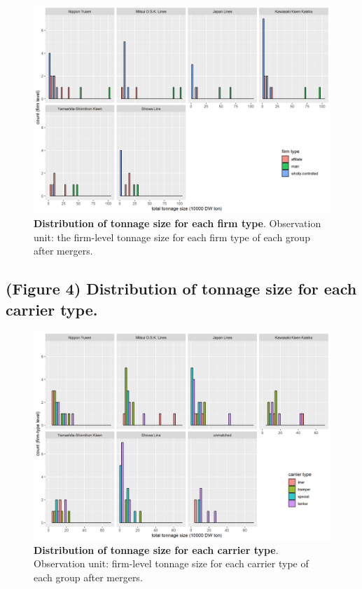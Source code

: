 \documentclass[
  10pt,
]{article}
\begin{document}
\begin{figure}[!ht]
\begin{center}
\includegraphics[height = 0.37\textheight]{../figuretable/type_dist_eachgroup.png}
\end{center}
\caption{\textbf{Distribution of tonnage size for each firm type}. Observation unit: the firm-level tonnage size for each firm type of each group after mergers.}
\label{fg:type_dist_eachgroup}
\end{figure}

\hypertarget{figure-4-distribution-of-tonnage-size-for-each-carrier-type.}{%
\subsection{(Figure 4) Distribution of tonnage size for each carrier
type.}\label{figure-4-distribution-of-tonnage-size-for-each-carrier-type.}}

\begin{figure}[!ht]
\begin{center}
\includegraphics[height = 0.37\textheight]{../figuretable/carrier_dist_eachgroup.png}
\end{center}
\caption{\textbf{Distribution of tonnage size for each carrier type}. Observation unit: firm-level tonnage size for each carrier type of each group after mergers. }
\label{fg:carrier_dist_eachgroup}
\end{figure}
\end{document}
